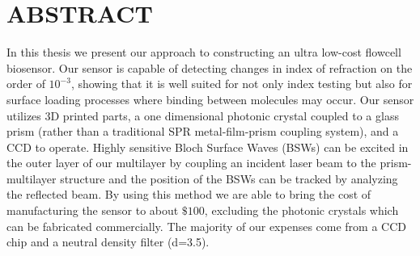 \section*{ABSTRACT}
\hspace{0.25in}
In this thesis we present our approach to constructing an ultra low-cost flowcell biosensor. Our sensor is capable of detecting changes in index of refraction on the order of $10^{-3}$, showing that it is well suited for not only index testing but also for surface loading processes where binding between molecules may occur. Our sensor utilizes 3D printed parts, a one dimensional photonic crystal coupled to a glass prism (rather than a traditional SPR metal-film-prism coupling system), and a CCD to operate. Highly sensitive Bloch Surface Waves (BSWs) can be excited in the outer layer of our multilayer by coupling an incident laser beam to the prism-multilayer structure and the position of the BSWs can be tracked by analyzing the reflected beam. By using this method we are able to bring the cost of manufacturing the sensor to about $\$100$, excluding the photonic crystals which can be fabricated commercially. The majority of our expenses come from a CCD chip and a neutral density filter (d=3.5). \\